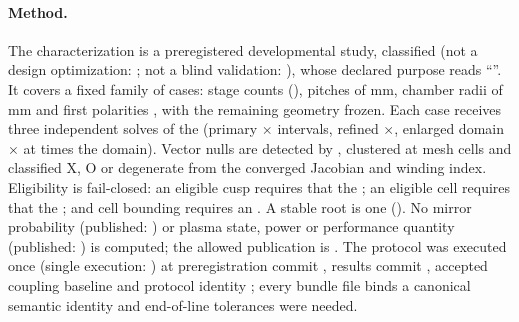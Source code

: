 \paragraph{Method.}
The characterization is a preregistered developmental study, classified
\texttt{\TchClassification} (not a design optimization: \TchNotOptimization; not a
blind validation: \TchNotValidation), whose declared purpose reads
``\TchPurpose''. It covers a fixed family of \TchFamilyCaseCount{} cases: \TchStageLevels{} stage
counts (\TchStageCounts), pitches of \TchPitches{} mm, chamber radii of
\TchRadii{} mm and first polarities \TchPolarities, with the remaining geometry
frozen. Each case receives three independent solves of the \TchFieldModel{}
(primary \TchPrimaryRadial$\times$\TchPrimaryAxial{} intervals, refined
\TchRefinedRadial$\times$\TchRefinedAxial, enlarged domain
\TchEnlargedRadial$\times$\TchEnlargedAxial{} at \TchEnlargedScale{} times the
domain). Vector nulls are detected by \texttt{\TchRootDetector}, clustered at
\TchClusterFactor{} mesh cells and classified X, O or degenerate from the converged
Jacobian and winding index. Eligibility is fail-closed: an eligible cusp requires
that the \TchCuspEligibility; an eligible cell requires that the \TchCellEligibility;
and cell bounding requires an \TchCellBoundingRequirement. A stable root is one
\TchStableRootDefinition{} (\TchCorrespondenceAlgorithm). No mirror probability
(published: \TchMirrorPublished) or plasma state, power or performance quantity
(published: \TchPlasmaPublished) is computed; the allowed publication is
\TchPublicationAllowed. The protocol was executed once (single execution:
\TchSingleExecution) at preregistration commit \texttt{\TchPreregCommit}, results
commit \texttt{\TchResultsCommit}, accepted coupling baseline
\texttt{\TchCouplingCommit} and protocol identity \texttt{\TchProtocolSemanticSha};
every bundle file binds a canonical semantic identity and \TchToleratedEolFiles{}
end-of-line tolerances were needed.

